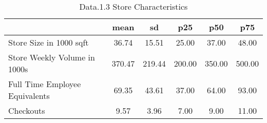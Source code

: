 \begin{table}[htbp]
\caption{\label{clabel} Data.1.3 Store Characteristics}\centering\medskip
\begin{tabular}{lccccc} \hline \hline
 & mean  & sd  & p25  & p50  & p75  \\  \hline 
Store Size in 1000 sqft &        36.74 &        15.51 &        25.00 &        37.00 &        48.00 \\  
Store Weekly Volume in 1000s &       370.47 &       219.44 &       200.00 &       350.00 &       500.00 \\  
Full Time Employee Equivalents &        69.35 &        43.61 &        37.00 &        64.00 &        93.00 \\  
Checkouts &         9.57 &         3.96 &         7.00 &         9.00 &        11.00 \\  
\hline \hline \end{tabular}
\end{table}
